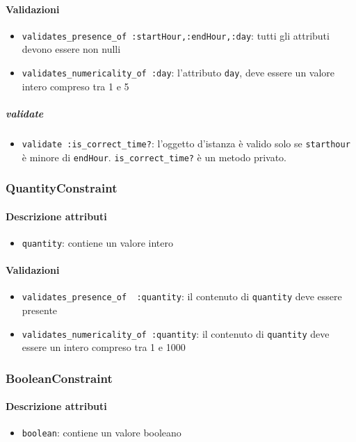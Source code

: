 \documentclass[11pt,a4paper]{article}
\begin{document}
\paragraph{Validazioni}
\begin{itemize}
 \item \verb|validates_presence_of :startHour,:endHour,:day|: tutti gli attributi devono essere non nulli
 \item \verb|validates_numericality_of :day|: l'attributo \verb|day|, deve essere un valore intero compreso tra 1 e 5
 \end{itemize}

\subparagraph{validate}
\begin{itemize}
 \item \verb|validate :is_correct_time?|: l'oggetto d'istanza è valido solo se \verb|starthour| è minore di \verb|endHour|. \verb|is_correct_time?| è un metodo privato.
\end{itemize}
\subsubsection{QuantityConstraint}
\paragraph{Descrizione attributi}
\begin{itemize}
 \item \verb|quantity|: contiene un valore intero
\end{itemize}
\paragraph{Validazioni}
\begin{itemize}
 \item \verb|validates_presence_of  :quantity|: il contenuto di \verb|quantity| deve essere presente
 \item \verb|validates_numericality_of :quantity|: il contenuto di \verb|quantity| deve essere un intero compreso tra 1 e 1000 
\end{itemize}
\subsubsection{BooleanConstraint}
\paragraph{Descrizione attributi}
\begin{itemize}
 \item \verb|boolean|: contiene un valore booleano
\end{itemize}
\end{document}
